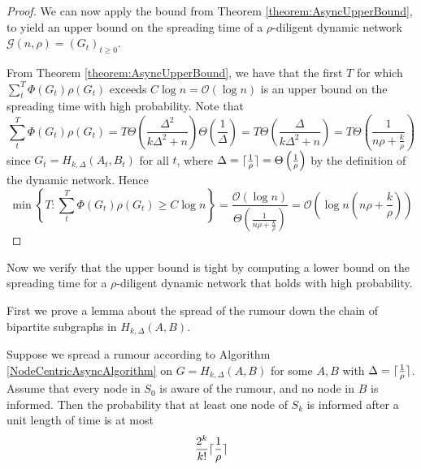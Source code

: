 \begin{proof}
	We can now apply the bound from Theorem \ref{theorem:AsyncUpperBound}, to yield an upper bound on the spreading time of a $\rho$-diligent dynamic network $\mathcal{G}(n, \rho) = (G_t)_{t\geq 0}$. 
	
	From Theorem \ref{theorem:AsyncUpperBound}, we have that the first $T$ for which $\sum_t^T \Phi(G_t)\rho(G_t)$ exceeds $C \log n = \mathcal{O}(\log n)$ is an upper bound on the spreading time with high probability.  Note that 
	$$
		\sum_t^T \Phi(G_t)\rho(G_t)
		= 
		T \Theta\left(\frac{\Delta^2}{k\Delta^2 +n }\right) \Theta\left(\frac{1}{\Delta}\right)
		= 
		T \Theta\left(\frac{\Delta}{k\Delta^2 +n }\right)
		= 
		T \Theta\left(\frac{1}{n \rho + \frac{k}{\rho}}\right)
	$$
	since $G_t = H_{k, \Delta}(A_t,B_t)$ for all $t$, where $\Delta = \lceil\frac{1}{\rho}\rceil = \Theta\left(\frac{1}{\rho}\right)$ by the definition of the dynamic network. Hence 
	$$
		\min \left\{T : \sum_t^T \Phi(G_t)\rho(G_t) \geq C \log n \right\}
		=
		\frac{\mathcal{O}(\log n)}{\Theta\left(\frac{1}{n \rho + \frac{k}{\rho}}\right)}
		= 
		\mathcal{O}\left(\log n \left(n \rho + \frac{k}{\rho}\right)\right)
	$$
\end{proof}

Now we verify that the upper bound is tight by computing a lower bound on the spreading time for a $\rho$-diligent dynamic network that holds with high probability.

First we prove a lemma about the spread of the rumour down the chain of bipartite subgraphs in $H_{k, \Delta}(A,B)$.

\begin{lemma}\label{lemma:H_k,DeltaABOneStep}
	Suppose we spread a rumour according to Algorithm \ref{NodeCentricAsyncAlgorithm} on $G = H_{k, \Delta}(A,B)$ for some $A, B$ with $\Delta = \lceil\frac{1}{\rho}\rceil$. Assume that every node in $S_0$ is aware of the rumour, and no node in $B$ is informed. Then the probability that at least one node of $S_k$ is informed after a unit length of time is at most
	$$
		\frac{2^k}{k!}\lceil\frac{1}{\rho}\rceil
	$$	
\end{lemma}


